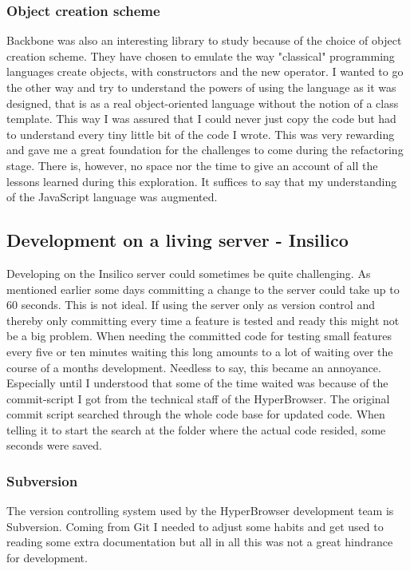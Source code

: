 \documentclass[english]{ifimaster}
\begin{document}
\subsubsection{Object creation scheme}
Backbone was also an interesting library to study because of the choice of object creation scheme. They have chosen to emulate the way "classical" programming languages create objects, with constructors and the new operator. I wanted to go the other way and try to understand the powers of using the language as it was designed, that is as a real object-oriented language without the notion of a class template. This way I was assured that I could never just copy the code but had to understand every tiny little bit of the code I wrote. This was very rewarding and gave me a great foundation for the challenges to come during the refactoring stage. There is, however, no space nor the time to give an account of all the lessons learned during this exploration. It suffices to say that my understanding of the JavaScript language was augmented.




\subsection{Development on a living server - Insilico}
Developing on the Insilico server could sometimes be quite challenging. As mentioned earlier some days committing a change to the server could take up to 60 seconds. This is not ideal. If using the server only as version control and thereby only committing every time a feature is tested and ready this might not be a big problem. When needing the committed code for testing small features every five or ten minutes waiting this long amounts to a lot of waiting over the course of a months development. Needless to say, this became an annoyance. Especially until I understood that some of the time waited was because of the commit-script I got from the technical staff of the HyperBrowser. The original commit script searched through the whole code base for updated code. When telling it to start the search at the folder where the actual code resided, some seconds were saved. 

\subsubsection{Subversion} The version controlling system used by the HyperBrowser development team is Subversion. Coming from Git I needed to adjust some habits and get used to reading some extra documentation but all in all this was not a great hindrance for development.
\end{document}
